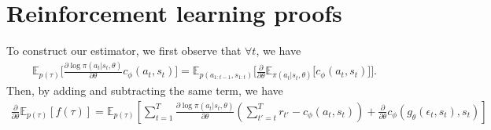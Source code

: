 \documentclass{article}
\newcommand{\E}{\mathbb{E}}
\newcommand{\LL}[1]{\frac{\partial \log \pi(a_{#1}| s_{#1}, \theta)}{\partial \theta}}
\newcommand{\PT}{\frac{\partial}{\partial \theta}}
\newcommand{\LP}[1]{\PT \log p(#1)}
\begin{document}



\section{Reinforcement learning proofs}
\label{rl appendix}

To construct our estimator, we first observe that $\forall t$, we have
%
\begin{align}
\E_{p(\tau)}\Big[\LL{t} c_\phi(a_t, s_t)\Big] = \E_{p(a_{1:t-1},s_{1:t})}\Big[\frac{\partial}{\partial\theta}\E_{\pi(a_t|s_t, \theta)}\Big[c_\phi(a_t, s_t)\Big]\Big].
\end{align}
%
Then, by adding and subtracting the same term, we have
%
\begin{align*}
\PT\E_{p(\tau)}[f(\tau)]
= \E_{p(\tau)}\left[ \sum_{t=1}^T \LL{t}\left(\sum_{t'=t}^T r_{t'} - c_\phi(a_t,s_t)\right)+\frac{\partial}{\partial\theta}c_\phi(g_\theta(\epsilon_t,s_t), s_t)\right]
\end{align*}
\end{document}
